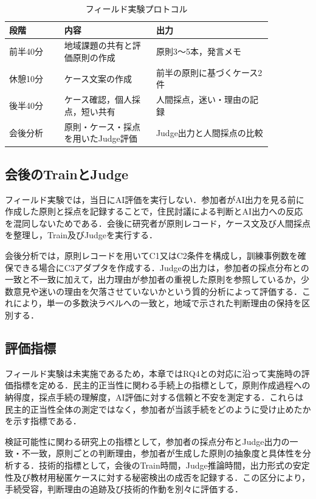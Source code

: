 \begin{table}[htbp]
\centering
\caption{フィールド実験プロトコル}
\label{tab:ch8_field_protocol}
\begin{tabular}{p{0.18\linewidth}p{0.30\linewidth}p{0.38\linewidth}}
\toprule
段階 & 内容 & 出力 \\
\midrule
前半40分 & 地域課題の共有と評価原則の作成 & 原則3〜5本，発言メモ \\
休憩10分 & ケース文案の作成 & 前半の原則に基づくケース2件 \\
後半40分 & ケース確認，個人採点，短い共有 & 人間採点，迷い・理由の記録 \\
会後分析 & 原則・ケース・採点を用いたJudge評価 & Judge出力と人間採点の比較 \\
\bottomrule
\end{tabular}
\end{table}

\subsection{会後のTrainとJudge}

フィールド実験では，当日にAI評価を実行しない．参加者がAI出力を見る前に作成した原則と採点を記録することで，住民討議による判断とAI出力への反応を混同しないためである．会後に研究者が原則レコード，ケース文及び人間採点を整理し，Train及びJudgeを実行する．

会後分析では，原則レコードを用いてC1又はC2条件を構成し，訓練事例数を確保できる場合にC3アダプタを作成する．Judgeの出力は，参加者の採点分布との一致と不一致に加えて，出力理由が参加者の重視した原則を参照しているか，少数意見や迷いの理由を欠落させていないかという質的分析によって評価する．これにより，単一の多数決ラベルへの一致と，地域で示された判断理由の保持を区別する．

\subsection{評価指標}

フィールド実験は未実施であるため，本章ではRQ4との対応に沿って実施時の評価指標を定める．民主的正当性に関わる手続上の指標として，原則作成過程への納得度，採点手続の理解度，AI評価に対する信頼と不安を測定する．これらは民主的正当性全体の測定ではなく，参加者が当該手続をどのように受け止めたかを示す指標である．

検証可能性に関わる研究上の指標として，参加者の採点分布とJudge出力の一致・不一致，原則ごとの判断理由，参加者が生成した原則の抽象度と具体性を分析する．技術的指標として，会後のTrain時間，Judge推論時間，出力形式の安定性及び教材用秘匿ケースに対する秘密検出の成否を記録する．この区分により，手続受容，判断理由の追跡及び技術的作動を別々に評価する．

